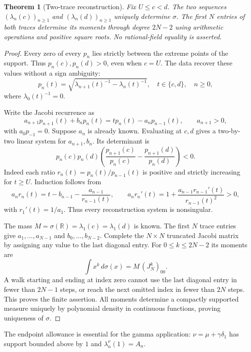 \documentclass[11pt,a4paper]{article}
\newtheorem{theorem}{Theorem}[section]
\theoremstyle{definition}
\theoremstyle{remark}
\theoremstyle{plain}
\numberwithin{equation}{section}
\begin{document}
\begin{theorem}[Two-trace reconstruction]\label{sc:sc:two-trace}
Fix $U\le c<d$.  The two sequences
$(\lambda_n(c))_{n\ge1}$ and $(\lambda_n(d))_{n\ge1}$ uniquely determine
$\sigma$.  The first $N$ entries of both traces determine its moments
through degree $2N-2$ using arithmetic operations and positive square
roots.  No rational-field equality is asserted.
\end{theorem}
\begin{proof}
Every zero of every $p_n$ lies strictly between the extreme points of
the support. Thus $p_n(c),p_n(d)>0$, even when $c=U$.  The data recover
these values without a sign ambiguity:
\begin{equation}\label{sc:sc:square-root}
 p_n(t)=\sqrt{\lambda_{n+1}(t)^{-1}-\lambda_n(t)^{-1}},
 \quad t\in\{c,d\},\quad n\ge0,
\end{equation}
where $\lambda_0(t)^{-1}=0$.

Write the Jacobi recurrence as
\[
 a_{n+1}p_{n+1}(t)+b_np_n(t)
       =tp_n(t)-a_np_{n-1}(t),\qquad a_{n+1}>0,
\]
with $a_0p_{-1}=0$.  Suppose $a_n$ is already known. Evaluating at
$c,d$ gives a two-by-two linear system for $a_{n+1},b_n$.
Its determinant is
\[
 p_n(c)p_n(d)
 \left(\frac{p_{n+1}(c)}{p_n(c)}-
       \frac{p_{n+1}(d)}{p_n(d)}\right)<0.
\]
Indeed each ratio $r_n(t)=p_n(t)/p_{n-1}(t)$ is positive and strictly
increasing for $t\ge U$.  Induction follows from
\[
 a_nr_n(t)=t-b_{n-1}-\frac{a_{n-1}}{r_{n-1}(t)},\qquad
 a_nr_n'(t)=1+\frac{a_{n-1}r_{n-1}'(t)}{r_{n-1}(t)^2}>0,
\]
with $r_1'(t)=1/a_1$. Thus every reconstruction system is nonsingular.

The mass $M=\sigma(\mathbb R)=\lambda_1(c)=\lambda_1(d)$ is known.
The first $N$ trace entries give
$a_1,\ldots,a_{N-1}$ and $b_0,\ldots,b_{N-2}$.  Complete the
$N\times N$ truncated Jacobi matrix by assigning any value to the last
diagonal entry.  For $0\le k\le2N-2$ its moments are
\[
 \int x^k\,d\sigma(x)=M\,(J_N^k)_{00}.
\]
A walk starting and ending at index zero cannot use the last diagonal
entry in fewer than $2N-1$ steps, or reach the next omitted index in
fewer than $2N$ steps.  This proves the finite assertion.  All moments
determine a compactly supported measure uniquely by polynomial density
in continuous functions, proving uniqueness of $\sigma$.
\end{proof}

The endpoint allowance is essential for the gamma application:
$\nu=\mu+\gamma\delta_1$ has support bounded above by $1$ and
$\lambda_n^\nu(1)=A_n$.
\end{document}
